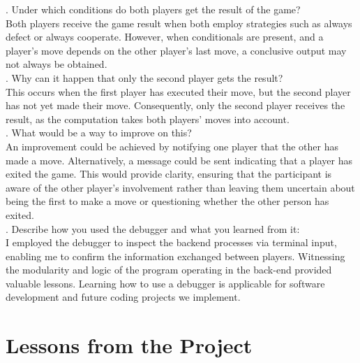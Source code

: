 \documentclass{article}
\theoremstyle{theorem}
\theoremstyle{definition}
\theoremstyle{remark}
\begin{document}
. Under which conditions do both players get the result of the game? \\

Both players receive the game result when both employ strategies such as always defect or always cooperate. However, when conditionals are present, and a player's move depends on the other player's last move, a conclusive output may not always be obtained.\\

. Why can it happen that only the second player gets the result?\\

This occurs when the first player has executed their move, but the second player has not yet made their move. Consequently, only the second player receives the result, as the computation takes both players' moves into account.\\

. What would be a way to improve on this?\\

An improvement could be achieved by notifying one player that the other has made a move. Alternatively, a message could be sent indicating that a player has exited the game. This would provide clarity, ensuring that the participant is aware of the other player's involvement rather than leaving them uncertain about being the first to make a move or questioning whether the other person has exited.\\

. Describe how you used the debugger and what you learned from it:\\

I employed the debugger to inspect the backend processes via terminal input, enabling me to confirm the information exchanged between players. Witnessing the modularity and logic of the program operating in the back-end provided valuable lessons. Learning how to use a debugger is applicable for software development and future coding projects we implement. 

\section{Lessons from the Project}
\end{document}
